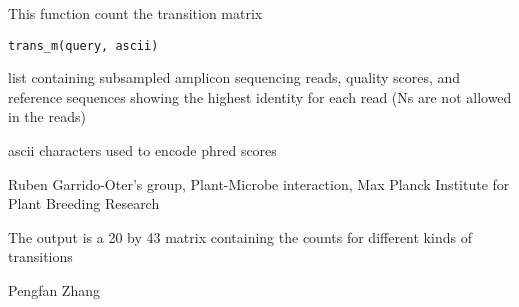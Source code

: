 \documentclass[a4paper]{book}
\begin{document}
%
\begin{Description}\relax
This function count the transition matrix
\end{Description}
%
\begin{Usage}
\begin{verbatim}
trans_m(query, ascii)
\end{verbatim}
\end{Usage}
%
\begin{Arguments}
\begin{ldescription}
\item[\code{query}] list containing subsampled amplicon sequencing reads, quality scores, and reference sequences showing the highest identity for each read (Ns are not allowed in the reads)

\item[\code{ascii}] ascii characters used to encode phred scores
\end{ldescription}
\end{Arguments}
%
\begin{Details}\relax
Ruben Garrido-Oter's group, Plant-Microbe interaction, Max Planck Institute for Plant Breeding Research
\end{Details}
%
\begin{Value}
The output is a 20 by 43 matrix containing the counts for different kinds of transitions
\end{Value}
%
\begin{Author}\relax
Pengfan Zhang
\end{Author}
\printindex{}
\end{document}
